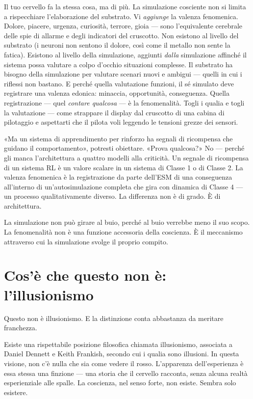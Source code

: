 \documentclass[11pt, twoside, openright]{book}
\begin{document}
Il tuo cervello fa la stessa cosa, ma di più. La simulazione cosciente non si limita a rispecchiare l'elaborazione del substrato. Vi \textit{aggiunge} la valenza fenomenica. Dolore, piacere, urgenza, curiosità, terrore, gioia --- sono l'equivalente cerebrale delle spie di allarme e degli indicatori del cruscotto. Non esistono al livello del substrato (i neuroni non sentono il dolore, così come il metallo non sente la fatica). Esistono al livello della simulazione, aggiunti \textit{dalla} simulazione affinché il sistema possa valutare a colpo d'occhio situazioni complesse. Il substrato ha bisogno della simulazione per valutare scenari nuovi e ambigui --- quelli in cui i riflessi non bastano. E perché quella valutazione funzioni, il sé simulato deve registrare una valenza edonica: minaccia, opportunità, conseguenza. Quella registrazione --- quel \textit{contare qualcosa} --- è la fenomenalità. Togli i qualia e togli la valutazione --- come strappare il display dal cruscotto di una cabina di pilotaggio e aspettarti che il pilota voli leggendo le tensioni grezze dei sensori.

«Ma un sistema di apprendimento per rinforzo ha segnali di ricompensa che guidano il comportamento», potresti obiettare. «Prova qualcosa?» No --- perché gli manca l'architettura a quattro modelli alla criticità. Un segnale di ricompensa di un sistema RL è un valore scalare in un sistema di Classe 1 o di Classe 2. La valenza fenomenica è la registrazione da parte dell'ESM di una conseguenza all'interno di un'autosimulazione completa che gira con dinamica di Classe 4 --- un processo qualitativamente diverso. La differenza non è di grado. È di architettura.

La simulazione non può girare al buio, perché al buio verrebbe meno il suo scopo. La fenomenalità non è una funzione accessoria della coscienza. È il meccanismo attraverso cui la simulazione svolge il proprio compito.

\section*{Cos'è che questo non è: l'illusionismo}

Questo non è illusionismo. E la distinzione conta abbastanza da meritare franchezza.

Esiste una rispettabile posizione filosofica chiamata illusionismo, associata a Daniel Dennett e Keith Frankish, secondo cui i qualia sono illusioni. In questa visione, non c'è nulla che sia come vedere il rosso. L'apparenza dell'esperienza è essa stessa una finzione --- una storia che il cervello racconta, senza alcuna realtà esperienziale alle spalle. La coscienza, nel senso forte, non esiste. Sembra solo esistere.
\end{document}
